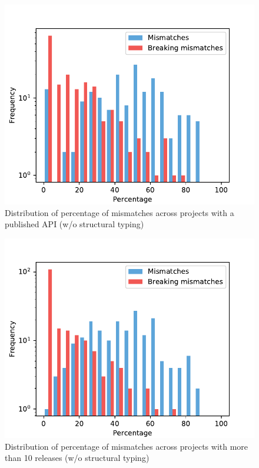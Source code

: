 \documentclass{l4proj}
\begin{document}
\begin{appendices}
\begin{figure}[]
\centering
\caption{Distribution of percentage of mismatches across projects with
a published API (w/o structural typing)}
\label{DistributionPublishedAPI}
\includegraphics[height=0.4\textheight]
{images/evaluation/distribution_mismatches_major_version_1}
\end{figure}

\begin{figure}[]
\centering
\caption{Distribution of percentage of mismatches across projects with
more than 10 releases (w/o structural typing)}
\label{DistributionTenReleases}
\includegraphics[height=0.4\textheight]
{images/evaluation/distribution_mismatches_more_than_10}
\end{figure}


\end{appendices}
\end{document}
